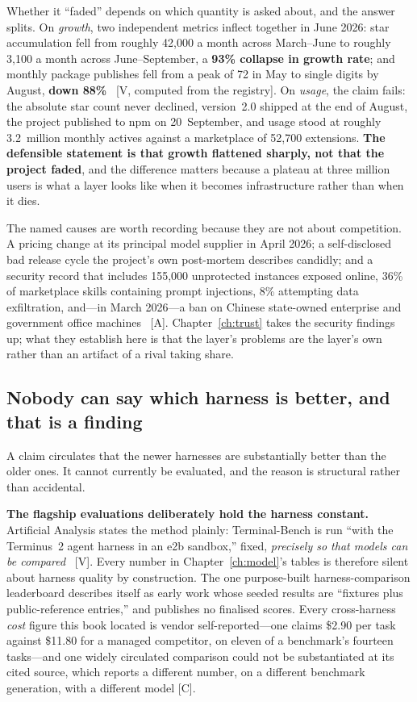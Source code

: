 Whether it ``faded'' depends on which quantity is asked about, and the answer splits. On \emph{growth}, two independent metrics inflect together in June 2026: star accumulation fell from roughly 42,000 a month across March--June to roughly 3,100 a month across June--September, a \textbf{93\% collapse in growth rate}; and monthly package publishes fell from a peak of 72 in May to single digits by August, \textbf{down 88\%}~\cite{openclaw-plateau} [V, computed from the registry]. On \emph{usage}, the claim fails: the absolute star count never declined, version~2.0 shipped at the end of August, the project published to npm on 20~September, and usage stood at roughly 3.2~million monthly actives against a marketplace of 52,700 extensions. \textbf{The defensible statement is that growth flattened sharply, not that the project faded}, and the difference matters because a plateau at three million users is what a layer looks like when it becomes infrastructure rather than when it dies.

The named causes are worth recording because they are not about competition. A pricing change at its principal model supplier in April 2026; a self-disclosed bad release cycle the project's own post-mortem describes candidly; and a security record that includes 155,000 unprotected instances exposed online, 36\% of marketplace skills containing prompt injections, 8\% attempting data exfiltration, and---in March 2026---a ban on Chinese state-owned enterprise and government office machines~\cite{openclaw-plateau} [A]. Chapter~\ref{ch:trust} takes the security findings up; what they establish here is that the layer's problems are the layer's own rather than an artifact of a rival taking share.

\subsection{Nobody can say which harness is better, and that is a finding}

A claim circulates that the newer harnesses are substantially better than the older ones. It cannot currently be evaluated, and the reason is structural rather than accidental.

\textbf{The flagship evaluations deliberately hold the harness constant.} Artificial Analysis states the method plainly: Terminal-Bench is run ``with the Terminus~2 agent harness in an e2b sandbox,'' fixed, \emph{precisely so that models can be compared}~\cite{harness-nobench} [V]. Every number in Chapter~\ref{ch:model}'s tables is therefore silent about harness quality by construction. The one purpose-built harness-comparison leaderboard describes itself as early work whose seeded results are ``fixtures plus public-reference entries,'' and publishes no finalised scores. Every cross-harness \emph{cost} figure this book located is vendor self-reported---one claims \$2.90 per task against \$11.80 for a managed competitor, on eleven of a benchmark's fourteen tasks---and one widely circulated comparison could not be substantiated at its cited source, which reports a different number, on a different benchmark generation, with a different model [C].


